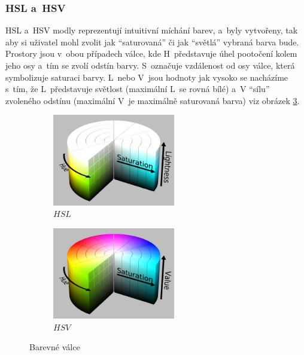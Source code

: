 \documentclass[11pt, a4paper, titlepage]{article}
\renewcommand{\uv}[1]{``#1''}
\begin{document}
\subsubsection{HSL a~HSV}
HSL a~HSV modly reprezentují intuitivní míchání barev, a~byly vytvořeny, tak aby si uživatel mohl zvolit jak \uv{saturovaná} či jak \uv{světlá} vybraná barva bude.
Prostory jsou v~obou případech válce, kde H~představuje úhel pootočení kolem jeho osy a~tím se zvolí odstín barvy.
S~označuje vzdálenost od osy válce, která symbolizuje saturaci barvy.
L~nebo V~jsou hodnoty jak vysoko se nacházíme s~tím, že L~představuje světlost (maximální L~se rovná bílé) a~V \uv{sílu} zvoleného odstínu (maximální V~je maximálně saturovaná barva) viz obrázek \ref{fig:hsv_hsl}.
\begin{figure}[h]
    \centering
    \begin{subfigure}[b]{0.3\textwidth}
        \includegraphics[height=4cm]{HSL.png}
        \caption{$HSL$}
        \label{fig:hsv_hsl:hsl}
    \end{subfigure}
    \hspace{0.2cm}
    \begin{subfigure}[b]{0.3\textwidth}
        \includegraphics[height=4cm]{HSV.png}
        \caption{$HSV$}
        \label{fig:hsv_hsl:hsv}
    \end{subfigure}
    
    \caption{Barevné válce \cite{wiki:HSL_and_HSV}}
    
    \label{fig:hsv_hsl}
\end{figure}
\end{document}
